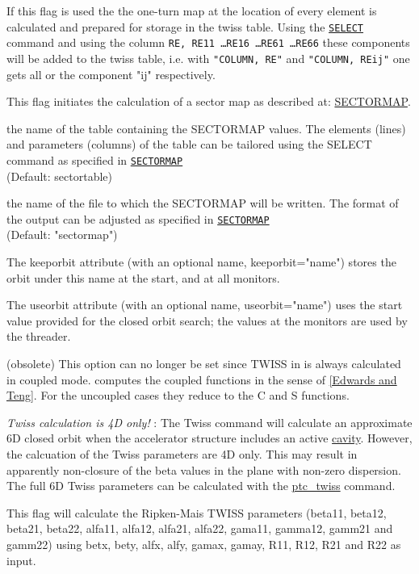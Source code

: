 \begin{madlist}
   If this flag is used the the one-turn map at the
  location of every element is calculated and prepared for
  storage in the twiss table. Using the
  \href{../Introduction/select.html}{\texttt{SELECT}} command and using
  the column \texttt{RE, RE11 \ldots RE16 \ldots RE61 \ldots RE66} these
  components will be added to the twiss table, i.e. with \texttt{"COLUMN, RE"} and
  \texttt{"COLUMN, REij"} one gets all or the component "ij" respectively.    

   This flag initiates the calculation of a sector
  map as described at:
  \href{../Introduction/sectormap.html}{SECTORMAP}.    
  
   the name of the table containing the SECTORMAP
  values. The elements (lines) and parameters (columns) 
  of the table can be tailored using the SELECT command as specified in 
  \hyperref[sec:sectormap]{\tt SECTORMAP} \\
  (Default: sectortable)

   the name of the file to which the SECTORMAP will
  be written. 
  The format of the output can be adjusted as specified in 
  \hyperref[sec:sectormap]{\tt SECTORMAP} \\
  (Default: "sectormap")
  
   The keeporbit attribute (with an optional name,
  keeporbit="name") stores the orbit under this name at the
  start, and at all monitors.    

   The useorbit attribute (with an optional name,
  useorbit="name") uses the start value provided for the closed
  orbit search; the values at the monitors are used by the
  threader.    

   (obsolete) This \madeight option can no
  longer be set since TWISS in \madx is always calculated in
  coupled mode. \madx computes the coupled functions in the
  sense of
  \href{../Introduction/bibliography.html#edwards}{[Edwards and
      Teng]}. For the uncoupled cases they reduce to the C and S
  functions.    
  
  \textit{ Twiss calculation is 4D only!} : The Twiss
  command will calculate an approximate 6D closed orbit when the
  accelerator structure includes an active
  \href{../Introduction/cavity.html}{cavity}. However, the
  calcuation of the Twiss parameters are 4D only. This may
  result in apparently non-closure of the beta values in the
  plane with non-zero dispersion. The full 6D Twiss parameters
  can be calculated with the
  \href{../ptc_twiss/ptc_twiss.html}{ptc\_twiss} command.    

   This flag will calculate the Ripken-Mais TWISS
  parameters (beta11, beta12, beta21, beta22, alfa11, alfa12,
  alfa21, alfa22, gama11, gamma12, gamm21 and gamm22) using
  betx, bety, alfx, alfy, gamax, gamay, R11, R12, R21 and R22 as
  input.  

\end{madlist}

